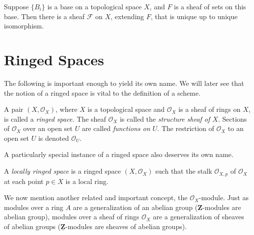 \documentclass[11pt,openany]{book} %
\newcommand{\Z}{\mathbf{Z}}
\begin{document}
\begin{theorem} \label{basesheaf}
Suppose $\{B_i\}$ is a base on a topological space $X$, and $F$ is a sheaf of sets on this base. Then there is a sheaf $\mathcal{F}$ on $X$, extending $F$, that is unique up to unique isomorphism.
\end{theorem}


\section{Ringed Spaces}
The following is important enough to yield its own name. We will later see that the notion of a ringed space is vital to the definition of a scheme.\\

\begin{definition}
A pair $(X, \mathcal{O}_X)$, where $X$ is a topological space and $\mathcal{O}_X$ is a sheaf of rings on $X$, is called a \emph{ringed space.} The sheaf $\mathcal{O}_X$ is called the \emph{structure sheaf of $X$}. Sections of $\mathcal{O}_X$ over an open set $U$ are called \emph{functions on $U$}. The restriction of $\mathcal{O}_X$ to an open set $U$ is denoted $\mathcal{O}_U$.
\end{definition}
\medskip

A particularly special instance of a ringed space also deserves its own name.\\

\begin{definition}
A \emph{locally ringed space} is a ringed space $(X, \mathcal{O}_X)$ such that the stalk $\mathcal{O}_{X,p}$ of $\mathcal{O}_X$ at each point $p \in X$ is a local ring.
\end{definition}
\medskip

We now mention another related and important concept, the $\mathcal{O}_X$-module. Just as modules over a ring $A$ are a generalization of an abelian group ($\Z$-modules are abelian group), modules over a sheaf of rings $\mathcal{O}_X$ are a generalization of sheaves of abelian groups ($\underline{\Z}$-modules are sheaves of abelian groups). \\
\end{document}
